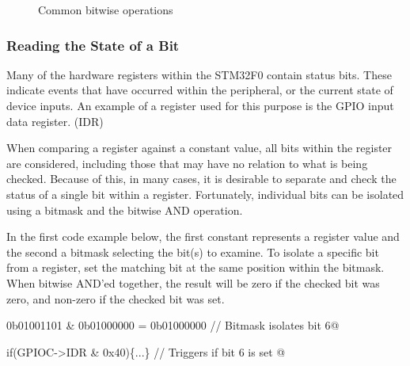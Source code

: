 \documentclass[11pt,fleqn]{book} %
\makeatletter
\newcommand{\ilcode}[1]{
    \smallskip
    \colorbox{gray!20!white}{
        \centering
        \parbox{\linewidth-2\fboxsep}{
            \lstinline@#1@
        }
    }
}
\newcommand{\code}[3]{
    \begin{figure}[]
        \colorbox{gray!20!white}{
            \parbox{\linewidth-2\fboxsep} {
                \centering 
                
            }
        }
        \caption{#2}
        \label{#3}
    \end{figure}
}
\makeatother
\begin{document}
\code{./files/bitops.c}{Common bitwise operations}{bitwise}

%        






\subsubsection{Reading the State of a Bit}

Many of the hardware registers within the STM32F0 contain status bits. These indicate events that have occurred within the peripheral, or the current state of device inputs. An example of a register used for this purpose is the GPIO input data register. (IDR)

When comparing a register against a constant value, all bits within the register are considered, including those that may have no relation to what is being checked. Because of this, in many cases, it is desirable to separate and check the status of a single bit within a register. Fortunately, individual bits can be isolated using a bitmask and the bitwise AND operation. 

\begin{example} 
In the first code example below, the first constant represents a register value and the second a bitmask selecting the bit(s) to examine. To isolate a specific bit from a register, set the matching bit at the same position within the bitmask. When bitwise AND'ed together, the result will be zero if the checked bit was zero, and non-zero if the checked bit was set. 

\ilcode{0b01001101 \& 0b01000000 = 0b01000000  // Bitmask isolates bit 6}

\ilcode{if(GPIOC->IDR \& 0x40)\{...\} // Triggers if bit 6 is set }
\smallskip
\end{example}
\end{document}

